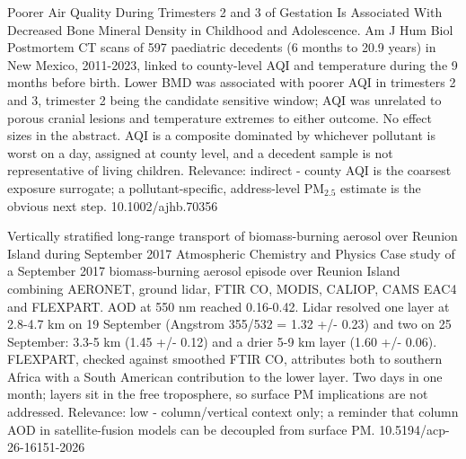\documentclass[10pt]{article}
\begin{document}
{Poorer Air Quality During Trimesters 2 and 3 of Gestation Is Associated With Decreased Bone Mineral Density in Childhood and Adolescence.}
{Am J Hum Biol}
{Postmortem CT scans of 597 paediatric decedents (6 months to 20.9 years) in New Mexico, 2011-2023, linked to county-level AQI and temperature during the 9 months before birth. Lower BMD was associated with poorer AQI in trimesters 2 and 3, trimester 2 being the candidate sensitive window; AQI was unrelated to porous cranial lesions and temperature extremes to either outcome. No effect sizes in the abstract. AQI is a composite dominated by whichever pollutant is worst on a day, assigned at county level, and a decedent sample is not representative of living children. Relevance: indirect - county AQI is the coarsest exposure surrogate; a pollutant-specific, address-level PM$_{2.5}$ estimate is the obvious next step.}
{10.1002/ajhb.70356}

\par{}\baselineskip{}\baselineskip
{}

{Vertically stratified long-range transport of biomass-burning aerosol over Reunion Island during September 2017}
{Atmospheric Chemistry and Physics}
{Case study of a September 2017 biomass-burning aerosol episode over Reunion Island combining AERONET, ground lidar, FTIR CO, MODIS, CALIOP, CAMS EAC4 and FLEXPART. AOD at 550 nm reached 0.16-0.42. Lidar resolved one layer at 2.8-4.7 km on 19 September (Angstrom 355/532 = 1.32 +/- 0.23) and two on 25 September: 3.3-5 km (1.45 +/- 0.12) and a drier 5-9 km layer (1.60 +/- 0.06). FLEXPART, checked against smoothed FTIR CO, attributes both to southern Africa with a South American contribution to the lower layer. Two days in one month; layers sit in the free troposphere, so surface PM implications are not addressed. Relevance: low - column/vertical context only; a reminder that column AOD in satellite-fusion models can be decoupled from surface PM.}
{10.5194/acp-26-16151-2026}
\end{document}
